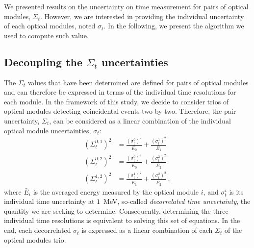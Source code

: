 


We presented results on the uncertainty on time measurement for pairs of optical modules, $\Sigma_{t}$.
However, we are interested in providing the individual uncertainty of each optical modules, noted $\sigma_{t}$.
In the following, we present the algorithm we used to compute such value.




\subsection{Decoupling the $\Sigma_{t}$ uncertainties}

The $\Sigma_{t}$ values that have been determined are defined for pairs of optical modules and can therefore be expressed in terms of the individual time resolutions for each module.
In the framework of this study, we decide to consider trios of optical modules detecting coincidental events two by two.
Therefore, the pair uncertainty, $\Sigma_{t}$, can be considered as a linear combination of the individual optical module uncertainties, $\sigma_{t}$:
\begin{align}
  (\Sigma_{t}^{0,1})^{2} &= \frac{(\sigma_{t}^{0})^{2}}{\bar{E_{0}}} + \frac{(\sigma_{t}^{1})^{2}}{\bar{E_{1}}}\nonumber \\
  (\Sigma_{t}^{0,2})^{2} &= \frac{(\sigma_{t}^{0})^{2}}{\bar{E_{0}}} + \frac{(\sigma_{t}^{2})^{2}}{\bar{E_{2}}}\\
  (\Sigma_{t}^{1,2})^{2} &= \frac{(\sigma_{t}^{1})^{2}}{\bar{E_{1}}} + \frac{(\sigma_{t}^{2})^{2}}{\bar{E_{2}}} \nonumber\,,
  \label{eq:Co_sigma}
\end{align}
where $\bar{E}_{i}$ is the averaged energy measured by the optical module $i$, and $\sigma_{t}^{i}$ is its individual time uncertainty at $1$~MeV, so-called \emph{decorrelated time uncertainty}, the quantity we are seeking to determine.
Consequently, determining the three individual time resolutions is equivalent to solving this set of equations.
In the end, each decorrelated $\sigma_{t}$ is expressed as a linear combination of each $\Sigma_{t}$ of the optical modules trio.

